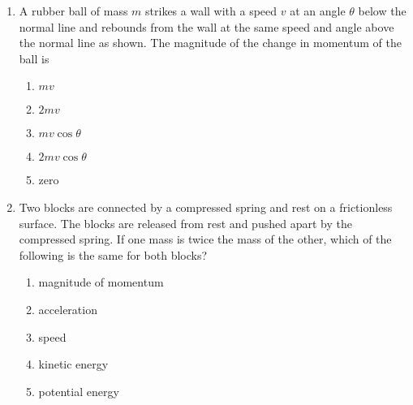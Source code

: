 \documentclass{../../../oss-apphys}
\begin{document}
\begin{multicols}{2}
\begin{enumerate}[leftmargin=18pt]
  \item A rubber ball of mass $m$ strikes a wall with a speed $v$ at an angle
    $\theta$ below the normal line and rebounds from the wall at the same speed
    and angle above the normal line as shown. The magnitude of the change in
    momentum of the ball is
    \begin{center}
    \end{center}
    \begin{enumerate}[nosep,leftmargin=18pt,label=(\Alph*)]
    \item $mv$
    \item $2mv$
    \item $mv\cos\theta$
    \item $2mv\cos\theta$
    \item zero
    \end{enumerate}
    
  \item Two blocks are connected by a compressed spring and rest on a
    frictionless surface. The blocks are released from rest and pushed apart
    by the compressed spring. If one mass is twice the mass of the other,
    which of the following is the same for both blocks?
    \begin{enumerate}[nosep,leftmargin=18pt,label=(\Alph*)]
    \item magnitude of momentum
    \item acceleration
    \item speed
    \item kinetic energy
    \item potential energy
    \end{enumerate}
    

\end{enumerate}
\end{multicols}
\end{document}
